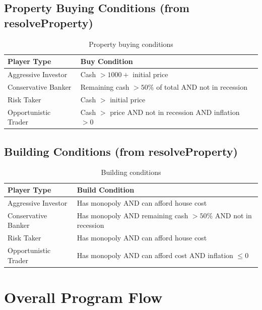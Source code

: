 \documentclass[12pt,a4paper]{article}
\begin{document}
\subsection{Property Buying Conditions (from resolveProperty)}

\begin{table}[h]
\centering
\small
\begin{tabular}{p{3.5cm}p{8cm}}
\toprule
\textbf{Player Type} & \textbf{Buy Condition} \\
\midrule
Aggressive Investor & Cash $> 1000 +$ initial price \\
Conservative Banker & Remaining cash $> 50\%$ of total AND not in recession \\
Risk Taker & Cash $>$ initial price \\
Opportunistic Trader & Cash $>$ price AND not in recession AND inflation $> 0$ \\
\bottomrule
\end{tabular}
\caption{Property buying conditions}
\end{table}

\subsection{Building Conditions (from resolveProperty)}

\begin{table}[h]
\centering
\small
\begin{tabular}{p{3.5cm}p{8cm}}
\toprule
\textbf{Player Type} & \textbf{Build Condition} \\
\midrule
Aggressive Investor & Has monopoly AND can afford house cost \\
Conservative Banker & Has monopoly AND remaining cash $> 50\%$ AND not in recession \\
Risk Taker & Has monopoly AND can afford house cost \\
Opportunistic Trader & Has monopoly AND can afford cost AND inflation $\leq 0$ \\
\bottomrule
\end{tabular}
\caption{Building conditions}
\end{table}

\newpage

\section{Overall Program Flow}
\end{document}
